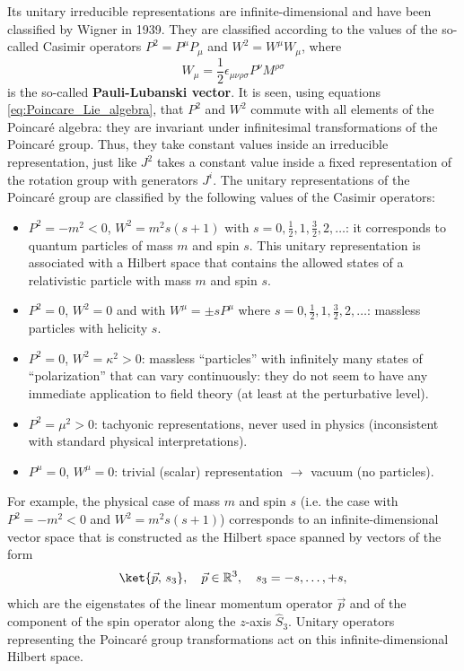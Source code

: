 Its unitary irreducible representations are infinite-dimensional and have been classified by Wigner in 1939. They are classified according to the values of the so-called Casimir operators $P^2 = P^\mu P_\mu$ and $W^2 = W^\mu W_\mu$, where
\[
    W_\mu = \frac{1}{2}\epsilon_{\mu\nu\rho\sigma} P^\nu M^{\rho\sigma}
\]
is the so-called \textbf{Pauli-Lubanski vector}. It is seen, using equations \eqref{eq:Poincare_Lie_algebra}, that $P^2$ and $W^2$ commute with all elements of the Poincaré algebra: they are invariant under infinitesimal transformations of the Poincaré group. Thus, they take constant values inside an irreducible representation, just like $J^2$ takes a constant value inside a fixed representation of the rotation group with generators $J^i$. The unitary representations of the Poincaré group are classified by the following values of the Casimir operators:
\begin{itemize}
    \item $P^2 = -m^2 < 0$, $W^2 = m^2 s(s + 1)$ with $s = 0, \frac{1}{2}, 1, \frac{3}{2}, 2, \dots$: it corresponds to quantum
          particles of mass $m$ and spin $s$. This unitary representation is associated with a Hilbert space
          that contains the allowed states of a relativistic particle with mass $m$ and spin $s$.

    \item $P^2 = 0$, $W^2 = 0$ and with $W^\mu = \pm s P^\mu$ where $s = 0, \frac{1}{2}, 1, \frac{3}{2}, 2, \dots$: massless particles with
          helicity $s$.

    \item $P^2 = 0$, $W^2 = \kappa^2 > 0$: massless ``particles'' with infinitely many states of ``polarization''
          that can vary continuously: they do not seem to have any immediate application to field theory
          (at least at the perturbative level).

    \item $P^2 = \mu^2 > 0$: tachyonic representations, never used in physics (inconsistent with
          standard physical interpretations).

    \item $P^\mu = 0$, $W^\mu = 0$: trivial (scalar) representation $\rightarrow$ vacuum (no particles).
\end{itemize}

For example, the physical case of mass $m$ and spin $s$ (i.e. the case with $P^2 = -m^2 < 0$ and $W^2 = m^2 s(s + 1)$) corresponds to an infinite-dimensional vector space that is constructed as the Hilbert space spanned by vectors of the form
\[
    \ket{\vec{p},\, s_3}, \quad \vec{p} \in \mathbb{R}^3, \quad s_3 = -s, \dots, +s,
\]
which are the eigenstates of the linear momentum operator $\vec{p}$ and of the component of the spin operator along the $z$-axis $\hat{S}_3$. Unitary operators representing the Poincaré group transformations act on this infinite-dimensional Hilbert space.